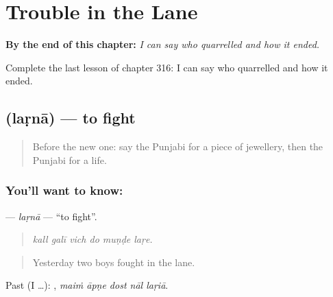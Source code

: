 
\chapter{Trouble in the Lane}
\label{ch:pa-a2-trouble-in-the-lane}

\begin{chapteropening}
\textbf{By the end of this chapter:} \emph{I can say who quarrelled and how it ended.}

Complete the last lesson of chapter 316: I can say who quarrelled and how it ended.
\end{chapteropening}

\section[\texorpdfstring{\pa{ਲੜਨਾ} (laṛnā)}{ਲੜਨਾ (laṛnā)}]{ (laṛnā) — to fight}

\label{lesson:PA-C316-larna}



\begin{quote}
Before the new one: say the Punjabi for a piece of jewellery, then the Punjabi for a life.
\end{quote}

\subsection*{You'll want to know: }
\textbf{} — \emph{laṛnā} — \textquotedblleft{}to fight\textquotedblright{}.

\begin{quote}
     
\end{quote}

\begin{quote}
\emph{kall galī vich do muṇḍe laṛe.}
\end{quote}

\begin{quote}
Yesterday two boys fought in the lane.
\end{quote}

Past (I …):     , \emph{maiṁ āpṇe dost nāl laṛiā}.

